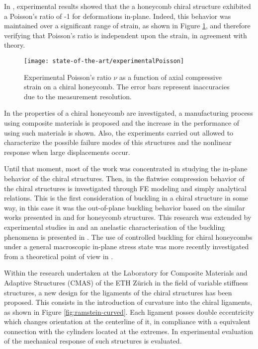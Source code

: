   In \cite{Prall1997}, experimental results showed that the a honeycomb chiral structure exhibited a Poisson's ratio of -1 for deformations in-plane. Indeed, this behavior was maintained over a significant range of strain, as shown in Figure \ref{fig:experimentalPoisson}, and therefore verifying that Poisson's ratio is independent upon the strain, in agreement with theory. 
  \begin{figure}[!htpb]
    \centering
    \texttt{[image: state-of-the-art/experimentalPoisson]}
    \caption[Experimental Poisson's ratio $v$ as a function of axial compressive strain on a chiral honeycomb]{Experimental Poisson's ratio $\nu$ as a function of axial compressive strain on a chiral honeycomb. The error bars represent inaccuracies due to the measurement resolution. \cite{Prall1997}}\label{fig:experimentalPoisson}
  \end{figure}

  In \cite{Bettini2010} the properties of a chiral honeycomb are investigated, a manufacturing process using composite materials is proposed and the increase in the performance of using such materials is shown. Also, the experiments carried out allowed to characterize the possible failure modes of this structures and the nonlinear response when large displacements occur.

  Until that moment, most of the work was concentrated in studying the in-plane behavior of the chiral structures. Then, in \cite{Spadoni2005} the flatwise compression behavior of the chiral structures is investigated through FE modeling and simply analytical relations. This is the first consideration of buckling in a chiral structure in some way, in this case it was the out-of-plane buckling behavior based on the similar works presented in \cite{Zhang1992} and \cite{Gibson1999} for honeycomb structures. This research was extended by experimental studies in \cite{Scarpa2007} and an anelastic characterisation of the buckling phenomena is presented in \cite{Miller2010}. The use of controlled buckling for chiral honeycombs under a general macroscopic in-plane stress state was more recently investigated from a theoretical point of view in \cite{Haghpanah2014}. 

  Within the research undertaken at the Laboratory for Composite Materials and Adaptive Structures (CMAS) of the ETH Z\"urich in the field of variable stiffness structures, a new design for the ligaments of the chiral structures has been proposed. This consists in the introduction of curvature into the chiral ligaments, as shown in Figure \ref{fig:ramstein-curved}. Each ligament posses double eccentricity which changes orientation at the centerline of it, in compliance with a equivalent connection with the cylinders located at the extremes. In \cite{Ramstein2016} experimental evaluation of the mechanical response of such structures is evaluated.

